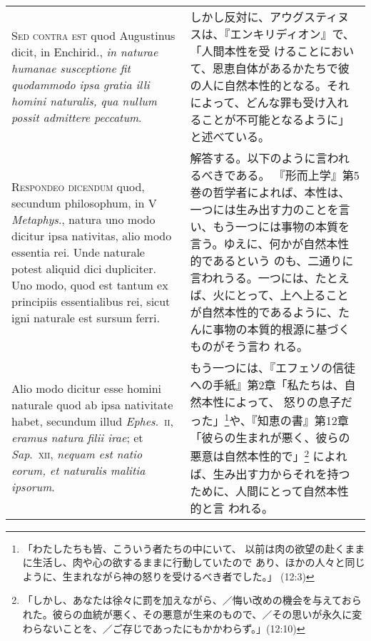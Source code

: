 \documentclass[10pt]{jsarticle} %
\begin{document}
\begin{longtable}{p{21em}p{21em}}
\\



{\scshape Sed contra est} quod Augustinus dicit, in Enchirid., {\itshape in naturae humanae
susceptione fit quodammodo ipsa gratia illi homini naturalis, qua nullum
possit admittere peccatum}.



&

しかし反対に、アウグスティヌスは、『エンキリディオン』で、「人間本性を受
 けることにおいて、恩恵自体があるかたちで彼の人に自然本性的となる。それ
 によって、どんな罪も受け入れることが不可能となるように」と述べている。


\\


{\scshape Respondeo dicendum} quod, secundum philosophum, in V {\itshape Metaphys}., natura
uno modo dicitur ipsa nativitas, alio modo essentia rei. Unde naturale
potest aliquid dici dupliciter. Uno modo, quod est tantum ex principiis
essentialibus rei, sicut igni naturale est sursum ferri. 


&


解答する。以下のように言われるべきである。
『形而上学』第5巻の哲学者によれば、本性は、一つには生み出す力のことを言
 い、もう一つには事物の本質を言う。ゆえに、何かが自然本性的であるという
 のも、二通りに言われうる。一つには、たとえば、火にとって、上へ上ること
 が自然本性的であるように、たんに事物の本質的根源に基づくものがそう言わ
 れる。

\\

Alio modo
dicitur esse homini naturale quod ab ipsa nativitate habet, secundum
illud {\itshape Ephes}.~{\scshape ii}, {\itshape eramus natura filii irae}; et {\itshape Sap}.~{\scshape xii}, {\itshape nequam est natio
eorum, et naturalis malitia ipsorum}. 


&

もう一つには、『エフェソの信徒への手紙』第2章「私たちは、自然本性によって、
 怒りの息子だった」\footnote{「わたしたちも皆、こういう者たちの中にいて、
 以前は肉の欲望の赴くままに生活し、肉や心の欲するままに行動していたので
 あり、ほかの人々と同じように、生まれながら神の怒りを受けるべき者でした。」
 (12:3)}や、『知恵の書』第12章「彼らの生まれが悪く、彼らの悪意は自然本性的で」\footnote{「しかし、あなたは徐々に罰を加えながら、／悔い改めの機会を与えておられた。彼らの血統が悪く、その悪意が生来のもので、／その思いが永久に変わらないことを、／ご存じであったにもかかわらず。」(12:10)}
によれば、生み出す力からそれを持つために、人間にとって自然本性的と言
 われる。



\end{longtable}
\end{document}

